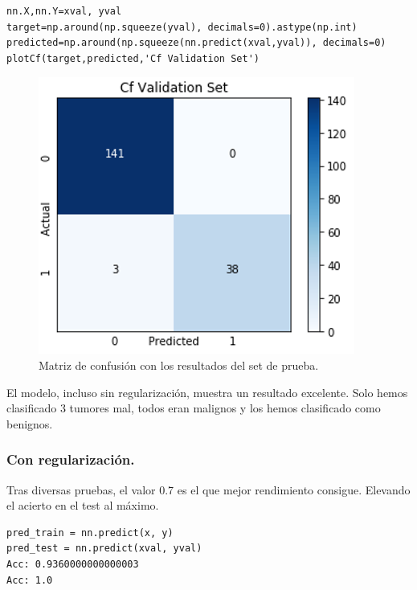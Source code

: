 \documentclass[a4paper,11pt]{article}
\begin{document}
\begin{lstlisting}
nn.X,nn.Y=xval, yval 
target=np.around(np.squeeze(yval), decimals=0).astype(np.int)
predicted=np.around(np.squeeze(nn.predict(xval,yval)), decimals=0)
plotCf(target,predicted,'Cf Validation Set')
\end{lstlisting}
\begin{figure}[H]
\centering
\includegraphics[scale=0.6]{Annotation 2020-03-23 190419}
\caption{Matriz de confusión con los resultados del set de prueba.}
\end{figure}
El modelo, incluso sin regularización, muestra un resultado excelente. Solo hemos clasificado 3 tumores mal, todos eran malignos  y los hemos clasificado como benignos.
\subsubsection{Con regularización.}
Tras diversas pruebas, el valor 0.7 es el que mejor rendimiento consigue. Elevando el acierto en el test al máximo.
\begin{lstlisting}
pred_train = nn.predict(x, y)
pred_test = nn.predict(xval, yval)
Acc: 0.9360000000000003
Acc: 1.0
\end{lstlisting}
\end{document}
